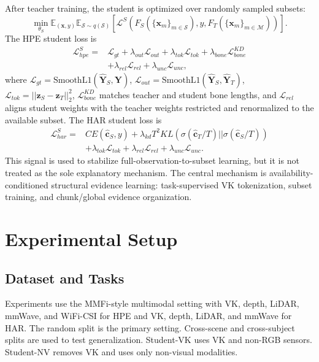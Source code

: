 ﻿\documentclass[journal]{IEEEtran}
\begin{document}
After teacher training, the student is optimized over randomly sampled subsets:
\begin{equation}
    \min_{\theta_S}
    \mathbb{E}_{(\mathbf{x},y)}
    \mathbb{E}_{\mathcal{S}\sim q(\mathcal{S})}
    \left[
    \mathcal{L}^{S}
    (F_S(\{\mathbf{x}_m\}_{m\in\mathcal{S}}),y,F_T(\{\mathbf{x}_m\}_{m\in\mathcal{M}}))
    \right].
\end{equation}
The HPE student loss is
\begin{equation}
\begin{aligned}
    \mathcal{L}^{S}_{hpe}=&
    \mathcal{L}_{gt}
    +\lambda_{out}\mathcal{L}_{out}
    +\lambda_{tok}\mathcal{L}_{tok}
    +\lambda_{bone}\mathcal{L}^{KD}_{bone} \\
    &+\lambda_{rel}\mathcal{L}_{rel}
    +\lambda_{unc}\mathcal{L}_{unc},
\end{aligned}
\end{equation}
where $\mathcal{L}_{gt}=\mathrm{SmoothL1}(\hat{\mathbf{Y}}_S,\mathbf{Y})$, $\mathcal{L}_{out}=\mathrm{SmoothL1}(\hat{\mathbf{Y}}_S,\hat{\mathbf{Y}}_T)$, $\mathcal{L}_{tok}=||\mathbf{z}_S-\mathbf{z}_T||_2^2$, $\mathcal{L}^{KD}_{bone}$ matches teacher and student bone lengths, and $\mathcal{L}_{rel}$ aligns student weights with the teacher weights restricted and renormalized to the available subset. The HAR student loss is
\begin{equation}
\begin{aligned}
    \mathcal{L}^{S}_{har}=&
    CE(\hat{\mathbf{c}}_S,y)
    +\lambda_{kd}T^2 KL(\sigma(\hat{\mathbf{c}}_T/T)||\sigma(\hat{\mathbf{c}}_S/T))\\
    &+\lambda_{tok}\mathcal{L}_{tok}
    +\lambda_{rel}\mathcal{L}_{rel}
    +\lambda_{unc}\mathcal{L}_{unc}.
\end{aligned}
\end{equation}
This signal is used to stabilize full-observation-to-subset learning, but it is not treated as the sole explanatory mechanism. The central mechanism is availability-conditioned structural evidence learning: task-supervised VK tokenization, subset training, and chunk/global evidence organization.

\section{Experimental Setup}

\subsection{Dataset and Tasks}
Experiments use the MMFi-style multimodal setting with VK, depth, LiDAR, mmWave, and WiFi-CSI for HPE and VK, depth, LiDAR, and mmWave for HAR. The random split is the primary setting. Cross-scene and cross-subject splits are used to test generalization. Student-VK uses VK and non-RGB sensors. Student-NV removes VK and uses only non-visual modalities.
\end{document}

